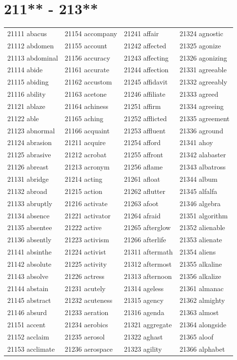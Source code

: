 \documentclass[10pt, oneside]{book}
\begin{document}
\begin{table}
	\centering
	\section*{211** - 213**}
	\begin{tabular}{l l l l}
21111 abacus &21154 accompany &21241 affair &21324 agnostic\\
21112 abdomen &21155 account &21242 affected &21325 agonize\\
21113 abdominal &21156 accuracy &21243 affecting &21326 agonizing\\
21114 abide &21161 accurate &21244 affection &21331 agreeable\\
21115 abiding &21162 accustom &21245 affidavit &21332 agreeably\\
21116 ability &21163 acetone &21246 affiliate &21333 agreed\\
21121 ablaze &21164 achiness &21251 affirm &21334 agreeing\\
21122 able &21165 aching &21252 afflicted &21335 agreement\\
21123 abnormal &21166 acquaint &21253 affluent &21336 aground\\
21124 abrasion &21211 acquire &21254 afford &21341 ahoy\\
21125 abrasive &21212 acrobat &21255 affront &21342 alabaster\\
21126 abreast &21213 acronym &21256 aflame &21343 albatross\\
21131 abridge &21214 acting &21261 afloat &21344 album\\
21132 abroad &21215 action &21262 aflutter &21345 alfalfa\\
21133 abruptly &21216 activate &21263 afoot &21346 algebra\\
21134 absence &21221 activator &21264 afraid &21351 algorithm\\
21135 absentee &21222 active &21265 afterglow &21352 alienable\\
21136 absently &21223 activism &21266 afterlife &21353 alienate\\
21141 absinthe &21224 activist &21311 aftermath &21354 aliens\\
21142 absolute &21225 activity &21312 aftermost &21355 alkaline\\
21143 absolve &21226 actress &21313 afternoon &21356 alkalize\\
21144 abstain &21231 acutely &21314 ageless &21361 almanac\\
21145 abstract &21232 acuteness &21315 agency &21362 almighty\\
21146 absurd &21233 aeration &21316 agenda &21363 almost\\
21151 accent &21234 aerobics &21321 aggregate &21364 alongside\\
21152 acclaim &21235 aerosol &21322 aghast &21365 aloof\\
21153 acclimate &21236 aerospace &21323 agility &21366 alphabet\\
	\end{tabular}
 \end{table}
\clearpage
\end{document}
